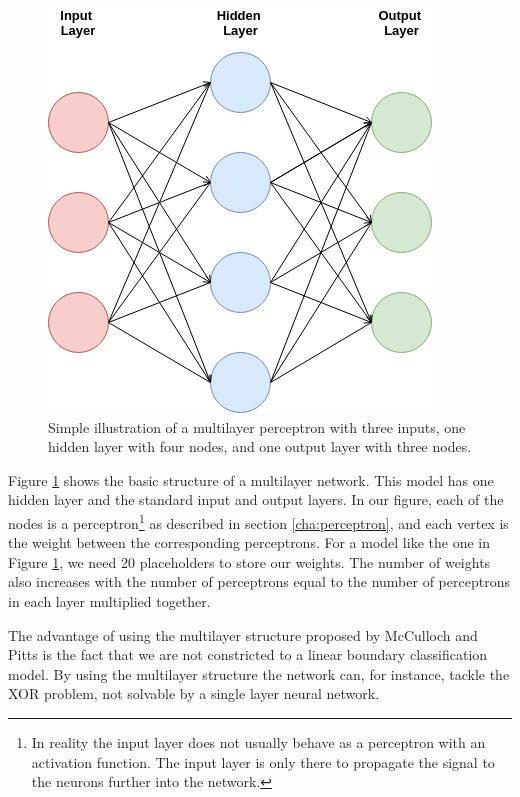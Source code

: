 \begin{figure}[h]
\centering
\includegraphics[scale=0.7]{background/figures/neural_network.png}
\caption{Simple illustration of a multilayer perceptron with three inputs, one hidden layer with four nodes, and one output layer with three nodes.}
\label{fig:mlnn}
\end{figure}


Figure \ref{fig:mlnn} shows the basic structure of a multilayer network. This model has one hidden layer and the standard input and output layers. In our figure, each of the nodes is a perceptron\footnote{In reality the input layer does not usually behave as a perceptron with an activation function. The input layer is only there to propagate the signal to the neurons further into the network.} as described in section \ref{cha:perceptron}, and each vertex is the weight between the corresponding perceptrons. For a model like the one in Figure \ref{fig:mlnn}, we need 20 placeholders to store our weights. The number of weights also increases with the number of perceptrons equal to the number of perceptrons in each layer multiplied together. 

The advantage of using the multilayer structure proposed by McCulloch and Pitts is the fact that we are not constricted to a linear boundary classification model. By using the multilayer structure the network can, for instance, tackle the XOR problem, not solvable by a single layer neural network. 




